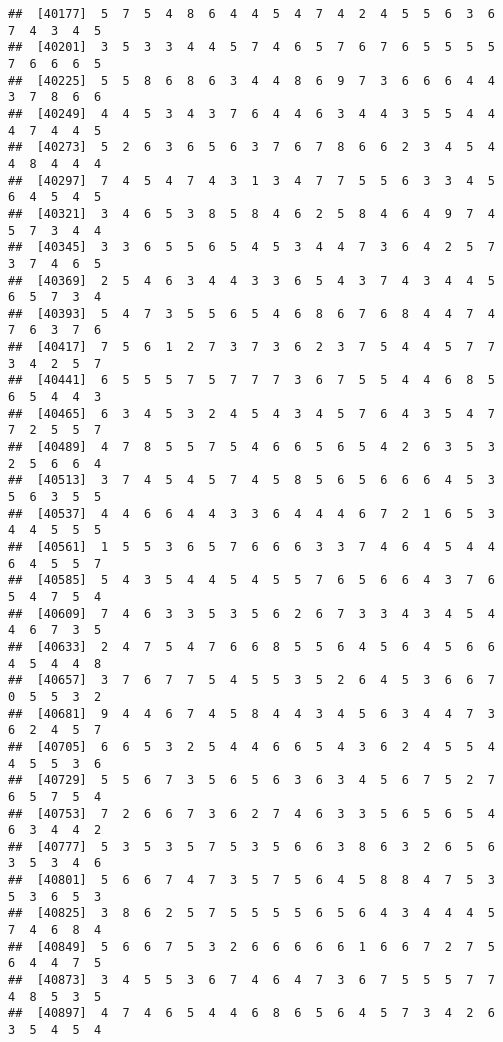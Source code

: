 \documentclass[
]{book}
\begin{document}
\begin{verbatim}
##  [40177]  5  7  5  4  8  6  4  4  5  4  7  4  2  4  5  5  6  3  6  7  4  3  4  5
##  [40201]  3  5  3  3  4  4  5  7  4  6  5  7  6  7  6  5  5  5  5  7  6  6  6  5
##  [40225]  5  5  8  6  8  6  3  4  4  8  6  9  7  3  6  6  6  4  4  3  7  8  6  6
##  [40249]  4  4  5  3  4  3  7  6  4  4  6  3  4  4  3  5  5  4  4  4  7  4  4  5
##  [40273]  5  2  6  3  6  5  6  3  7  6  7  8  6  6  2  3  4  5  4  4  8  4  4  4
##  [40297]  7  4  5  4  7  4  3  1  3  4  7  7  5  5  6  3  3  4  5  6  4  5  4  5
##  [40321]  3  4  6  5  3  8  5  8  4  6  2  5  8  4  6  4  9  7  4  5  7  3  4  4
##  [40345]  3  3  6  5  5  6  5  4  5  3  4  4  7  3  6  4  2  5  7  3  7  4  6  5
##  [40369]  2  5  4  6  3  4  4  3  3  6  5  4  3  7  4  3  4  4  5  6  5  7  3  4
##  [40393]  5  4  7  3  5  5  6  5  4  6  8  6  7  6  8  4  4  7  4  7  6  3  7  6
##  [40417]  7  5  6  1  2  7  3  7  3  6  2  3  7  5  4  4  5  7  7  3  4  2  5  7
##  [40441]  6  5  5  5  7  5  7  7  7  3  6  7  5  5  4  4  6  8  5  6  5  4  4  3
##  [40465]  6  3  4  5  3  2  4  5  4  3  4  5  7  6  4  3  5  4  7  7  2  5  5  7
##  [40489]  4  7  8  5  5  7  5  4  6  6  5  6  5  4  2  6  3  5  3  2  5  6  6  4
##  [40513]  3  7  4  5  4  5  7  4  5  8  5  6  5  6  6  6  4  5  3  5  6  3  5  5
##  [40537]  4  4  6  6  4  4  3  3  6  4  4  4  6  7  2  1  6  5  3  4  4  5  5  5
##  [40561]  1  5  5  3  6  5  7  6  6  6  3  3  7  4  6  4  5  4  4  6  4  5  5  7
##  [40585]  5  4  3  5  4  4  5  4  5  5  7  6  5  6  6  4  3  7  6  5  4  7  5  4
##  [40609]  7  4  6  3  3  5  3  5  6  2  6  7  3  3  4  3  4  5  4  4  6  7  3  5
##  [40633]  2  4  7  5  4  7  6  6  8  5  5  6  4  5  6  4  5  6  6  4  5  4  4  8
##  [40657]  3  7  6  7  7  5  4  5  5  3  5  2  6  4  5  3  6  6  7  0  5  5  3  2
##  [40681]  9  4  4  6  7  4  5  8  4  4  3  4  5  6  3  4  4  7  3  6  2  4  5  7
##  [40705]  6  6  5  3  2  5  4  4  6  6  5  4  3  6  2  4  5  5  4  4  5  5  3  6
##  [40729]  5  5  6  7  3  5  6  5  6  3  6  3  4  5  6  7  5  2  7  6  5  7  5  4
##  [40753]  7  2  6  6  7  3  6  2  7  4  6  3  3  5  6  5  6  5  4  6  3  4  4  2
##  [40777]  5  3  5  3  5  7  5  3  5  6  6  3  8  6  3  2  6  5  6  3  5  3  4  6
##  [40801]  5  6  6  7  4  7  3  5  7  5  6  4  5  8  8  4  7  5  3  5  3  6  5  3
##  [40825]  3  8  6  2  5  7  5  5  5  5  6  5  6  4  3  4  4  4  5  7  4  6  8  4
##  [40849]  5  6  6  7  5  3  2  6  6  6  6  6  1  6  6  7  2  7  5  6  4  4  7  5
##  [40873]  3  4  5  5  3  6  7  4  6  4  7  3  6  7  5  5  5  7  7  4  8  5  3  5
##  [40897]  4  7  4  6  5  4  4  6  8  6  5  6  4  5  7  3  4  2  6  3  5  4  5  4

\end{verbatim}
\end{document}
